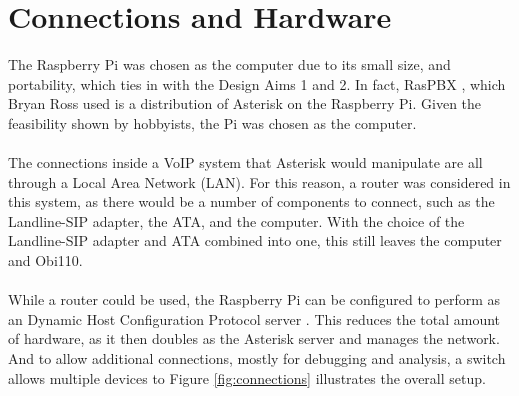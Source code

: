 \documentclass[main.tex]{subfiles}
\begin{document}
\section{Connections and Hardware}
The Raspberry Pi was chosen as the computer due to its small size, and portability, which ties in with the Design Aims 1 and 2. In fact, RasPBX \cite{raspbx}, which Bryan Ross used \cite{bryanross} is a distribution of Asterisk on the Raspberry Pi. Given the feasibility shown by hobbyists, the Pi was chosen as the computer.
\\\\
The connections inside a VoIP system that Asterisk would manipulate are all through a Local Area Network (LAN). For this reason, a router was considered in this system, as there would be a number of components to connect, such as the Landline-SIP adapter, the ATA, and the computer. With the choice of the Landline-SIP adapter and ATA combined into one, this still leaves the computer and Obi110.
\\\\
While a router could be used, the Raspberry Pi can be configured to perform as an Dynamic Host Configuration Protocol server \cite{pi-dhcp}. This reduces the total amount of hardware, as it then doubles as the Asterisk server and manages the network. And to allow additional connections, mostly for debugging and analysis, a switch allows multiple devices to Figure \ref{fig:connections} illustrates the overall setup.
\end{document}
